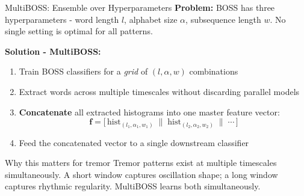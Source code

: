 \documentclass[aspectratio=169, 11pt]{beamer}
\begin{document}
\begin{frame}{MultiBOSS: Ensemble over Hyperparameters}
  \small
  \textbf{Problem:} BOSS has three hyperparameters - word length $l$,
  alphabet size $\alpha$, subsequence length $w$.
  No single setting is optimal for all patterns.

  \vspace{0.4em}
  \textbf{Solution - MultiBOSS:}
  \begin{enumerate}
    \item Train BOSS classifiers for a \emph{grid} of $(l, \alpha, w)$ combinations
    \item Extract words across multiple timescales without discarding parallel models
    \item \textbf{Concatenate} all extracted histograms into one master feature vector:
      \[
        \mathbf{f} = \bigl[\,\mathrm{hist}_{(l_1,\alpha_1,w_1)} \;\|\;
                              \mathrm{hist}_{(l_2,\alpha_2,w_2)} \;\|\;
                              \cdots \,\bigr]
      \]
    \item Feed the concatenated vector to a single downstream classifier
  \end{enumerate}

  \vspace{0.3em}
  \begin{exampleblock}{Why this matters for tremor}
    \small
    Tremor patterns exist at multiple timescales simultaneously.
    A short window captures oscillation shape; a long window captures rhythmic
    regularity. MultiBOSS learns both simultaneously.
  \end{exampleblock}
\end{frame}
\end{document}
